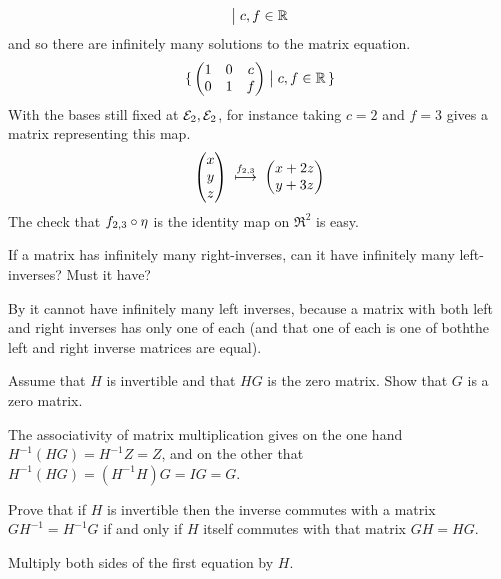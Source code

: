 \begin{exercises}
\begin{answer}
\begin{equation*}
{             \bigm|c,f\in\mathbb{R}}
      \end{equation*}
      and so there are infinitely many solutions to the matrix equation.
      \begin{equation*}
        \mbox{$\{\,\begin{pmatrix}
               1  &0  &c  \\
               0  &1  &f
             \end{pmatrix}
             \bigm| c,f\in\mathbb{R}\,\}$}
      \end{equation*}
      With the bases still fixed at ${\cal E}_2,{\cal E}_2$, 
      for instance taking $c=2$ and 
      $f=3$ gives a matrix representing this map.
      \begin{equation*}
        \begin{pmatrix} x \\ y \\ z \end{pmatrix}
        \;\stackrel{f_{2,3}}{\longmapsto}\;
        \begin{pmatrix} x+2z \\ y+3z \end{pmatrix}
      \end{equation*}
      The check that $f_{2,3}\mathbin\circ \eta$ is the identity map on
      $\Re^2$ is easy.
    \end{answer}
  \item  
    If a matrix has infinitely many right-inverses, can it have infinitely
    many left-inverses?
    Must it have?
    \begin{answer}
      By  it cannot have infinitely many 
      left inverses, because
      a matrix with both left and right inverses has only one of each (and
      that one of each is one of both\Dash the left and right inverse matrices
      are equal).  
    \end{answer}
  \recommended \item
    Assume that \( H \) is invertible and that \( HG \) is the zero matrix.
    Show that \( G \) is a zero matrix.
    \begin{answer}
      The associativity of matrix multiplication gives
      on the one hand
      \( H^{-1}(HG)=H^{-1}Z=Z \), and on the other that
      \( H^{-1}(HG)=(H^{-1}H)G=IG=G \).
    \end{answer}
  \item 
    Prove that if \( H \) is invertible then
    the inverse commutes with a matrix \( GH^{-1}=H^{-1}G \) 
    if and only if $H$ itself commutes with that matrix \( GH=HG \).
    \begin{answer}
       Multiply both sides of the first equation by $H$.
    \end{answer}

\end{exercises}
